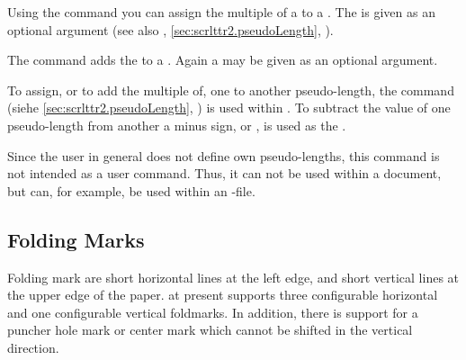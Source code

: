 \begin{Declaration}
\end{Declaration}
Using the command  you can assign the multiple of a
 to a . The  is given as an
optional argument (see also ,
\autoref{sec:scrlttr2.pseudoLength},
).

The command  adds the  to a
. Again a  may be given as an optional
argument.

To assign, or to add the multiple of, one  to another
pseudo-length, the command  (siehe
\autoref{sec:scrlttr2.pseudoLength},
) is used within .  To
subtract the value of one pseudo-length from another  a
minus sign, or , is used as the .

Since the user in general does not define own pseudo-lengths, this command is
not intended as a user command. Thus, it can not be used within a document,
but can, for example, be used within an -file.%
%
\EndIndexGroup


\subsection{Folding Marks}
\BeginIndexGroup
{}
%

Folding mark are short horizontal lines at the left edge, and short vertical
lines at the upper edge of the paper. \KOMAScript{} at present supports three
configurable horizontal and one configurable vertical foldmarks. In addition,
there is support for a puncher hole mark or center mark which cannot be
shifted in the vertical direction.


